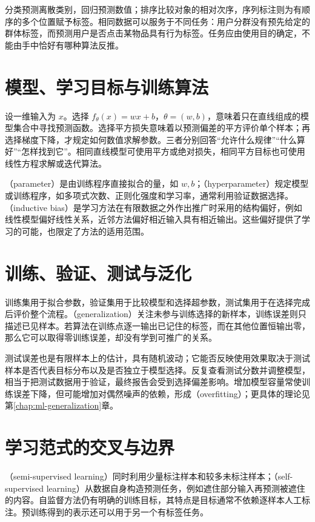 \documentclass[UTF8,12pt,a4paper,fontset=fandol]{ctexbook}
\begin{document}
分类预测离散类别，回归预测数值；排序比较对象的相对次序，序列标注则为有顺序的多个位置赋予标签。相同数据可以服务于不同任务：用户分群没有预先给定的群体标签，而预测用户是否点击某物品具有行为标签。任务应由使用目的确定，不能由手中恰好有哪种算法反推。

\section{模型、学习目标与训练算法}

设一维输入为 $x$。选择 $f_\theta(x)=wx+b$，$\theta=(w,b)$，意味着只在直线组成的模型集合中寻找预测函数。选择平方损失意味着以预测偏差的平方评价单个样本；再选择梯度下降，才规定如何数值求解参数。三者分别回答“允许什么规律”“什么算好”“怎样找到它”。相同直线模型可使用平方或绝对损失，相同平方目标也可使用线性方程求解或迭代算法。

（parameter）是由训练程序直接拟合的量，如 $w,b$；（hyperparameter）规定模型或训练程序，如多项式次数、正则化强度和学习率，通常利用验证数据选择。（inductive bias）是学习方法在有限数据之外作出推广时采用的结构偏好，例如线性模型偏好线性关系，近邻方法偏好相近输入具有相近输出。这些偏好提供了学习的可能，也限定了方法的适用范围。

\section{训练、验证、测试与泛化}

训练集用于拟合参数，验证集用于比较模型和选择超参数，测试集用于在选择完成后评价整个流程。（generalization）关注未参与训练选择的新样本，训练误差则只描述已见样本。若算法在训练点逐一输出已记住的标签，而在其他位置恒输出零，那么它可以取得零训练误差，却没有学到可推广的关系。

测试误差也是有限样本上的估计，具有随机波动；它能否反映使用效果取决于测试样本是否代表目标分布以及是否独立于模型选择。反复查看测试分数并调整模型，相当于把测试数据用于验证，最终报告会受到选择偏差影响。增加模型容量常使训练误差下降，但可能增加对偶然噪声的依赖，形成（overfitting）；更具体的理论见第\ref{chap:ml-generalization}章。

\section{学习范式的交叉与边界}

（semi-supervised learning）同时利用少量标注样本和较多未标注样本；（self-supervised learning）从数据自身构造预测任务，例如遮住部分输入再预测被遮住的内容。自监督方法仍有明确的训练目标，其特点是目标通常不依赖逐样本人工标注。预训练得到的表示还可以用于另一个有标签任务。
\end{document}
